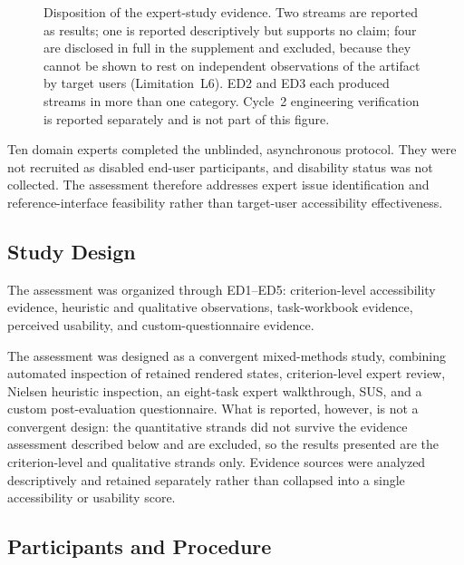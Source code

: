 \documentclass[journal]{IEEEtran}
\begin{document}
\begin{figure}[!t]
\caption{Disposition of the expert-study evidence. Two streams are reported as results; one is reported descriptively but supports no claim; four are disclosed in full in the supplement and excluded, because they cannot be shown to rest on independent observations of the artifact by target users (Limitation~L6). ED2 and ED3 each produced streams in more than one category. Cycle~2 engineering verification is reported separately and is not part of this figure.}
\label{fig:evidence-funnel}
\end{figure}


Ten domain experts completed the unblinded, asynchronous protocol. They were not recruited as disabled end-user participants, and disability status was not collected. The assessment therefore addresses expert issue identification and reference-interface feasibility rather than target-user accessibility effectiveness.

\subsection{Study Design}
\label{subsec:study-design}

The assessment was organized through ED1--ED5: criterion-level accessibility evidence, heuristic and qualitative observations, task-workbook evidence, perceived usability, and custom-questionnaire evidence.

The assessment was designed as a convergent mixed-methods study\cite{creswell2017research}, combining automated inspection of retained rendered states, criterion-level expert review, Nielsen heuristic inspection, an eight-task expert walkthrough, SUS, and a custom post-evaluation questionnaire. What is reported, however, is not a convergent design: the quantitative strands did not survive the evidence assessment described below and are excluded, so the results presented are the criterion-level and qualitative strands only. Evidence sources were analyzed descriptively and retained separately rather than collapsed into a single accessibility or usability score.

\subsection{Participants and Procedure}
\label{subsec:participants}
\end{document}

